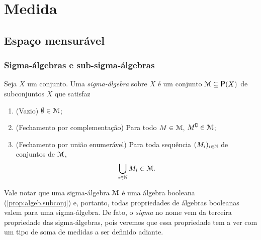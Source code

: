 \chapter{Medida}

\section{Espaço mensurável}

\subsection{Sigma-álgebras e sub-sigma-álgebras}

\begin{definition}
Seja $X$ um conjunto. Uma \emph{sigma-álgebra} sobre $X$ é um conjunto $\mens \subseteq \p(X)$ de subconjuntos $X$ que satisfaz
	\begin{enumerate}
	\item (Vazio) $\emptyset \in \mathcal{M}$;
	\item (Fechamento por complementação) Para todo $M \in \mathcal{M}$, $M^\complement \in \mathcal{M}$;
	\item (Fechamento por união enumerável) Para toda sequência $(M_i)_{i \in \mathbb{N}}$ de conjuntos de $\mathcal{M}$,
	\begin{equation*}
	\bigcup_{i \in \mathbb{N}} M_i \in \mathcal{M}.
	\end{equation*}
	\end{enumerate}
\end{definition}

	Vale notar que uma sigma-álgebra $\mathcal{M}$ é uma álgebra booleana (\ref{prop:algeb.subconj}) e, portanto, todas propriedades de álgebras booleanas valem para uma sigma-álgebra. De fato, o \textit{sigma} no nome vem da terceira propriedade das sigma-álgebras, pois veremos que essa propriedade tem a ver com um tipo de soma de medidas a ser definido adiante.

